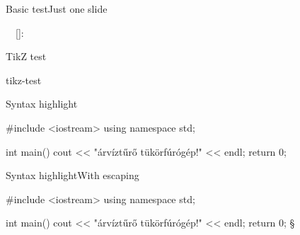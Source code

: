 \newtoks\nicsroot{}

\endofdump





\begin{slide}{Basic test}{Just one slide}
  \begin{nicscolumn}
    \begin{nicsextern}{}
      {\ \ []:\ \ }
    \end{nicsextern}
  \end{nicscolumn}
\end{slide}

\begin{slide}{TikZ test}{}
  \begin{nicscolumn}
    \begin{nicsextern}{tikz-test}
    \end{nicsextern}
  \end{nicscolumn}
\end{slide}

\begin{slide}{Syntax highlight}{}
  \begin{nicscolumn}
    \begin{nicsextern}{}
      #include <iostream>
      using namespace std;

      int main() {
        cout << "árvíztűrő tükörfúrógép!" << endl;
        return 0;
      }
    \end{nicsextern}
  \end{nicscolumn}
\end{slide}

\begin{slide}{Syntax highlight}{With escaping}
  \begin{nicscolumn}
    \begin{nicsextern}{}
      #include <iostream>
      using namespace std;

      int main() {
        cout << "árvíztűrő tükörfúrógép!" << endl;
        return 0; §\textcolor{orange}{}
      }
    \end{nicsextern}
  \end{nicscolumn}
\end{slide}


